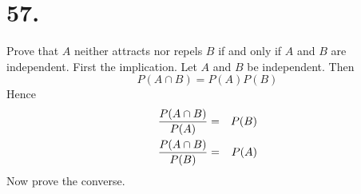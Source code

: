 \section*{57.}
Prove that $A$ neither attracts nor repels $B$ if and only if $A$ and $B$
are independent.
\bigskip
\noindent
First the implication.
Let $A$ and $B$ be independent.
Then
$$P(A\cap B)=P(A)P(B)$$
Hence
\begin{eqnarray*}
{P(A\cap B)\over P(A)}&=&P(B)\\
{P(A\cap B)\over P(B)}&=&P(A)
\end{eqnarray*}
Now prove the converse.

